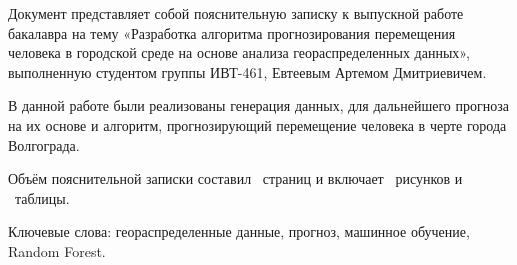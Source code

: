 \documentclass[a4paper,english,russian]{G2-105}
\begin{document}
\VSTUSetFacilityExpert{}{}{}{}
\VSTUInitializePZ
{}
\par Документ представляет собой пояснительную записку к выпускной работе бакалавра на тему «Разработка алгоритма прогнозирования перемещения человека в городской среде на основе анализа геораспределенных данных», выполненную студентом группы ИВТ-461, Евтеевым Артемом Дмитриевичем.
\par В данной работе были реализованы генерация данных, для дальнейшего прогноза на их основе и алгоритм, прогнозирующий перемещение человека в черте города Волгограда.
\par Объём пояснительной записки составил \totalpages~страниц и включает \totalfigures~рисунков и \totaltables~таблицы. 
\par Ключевые слова: геораспределенные данные, прогноз, машинное обучение, Random Forest.
\tableofcontents
\newpage



\end{document}
